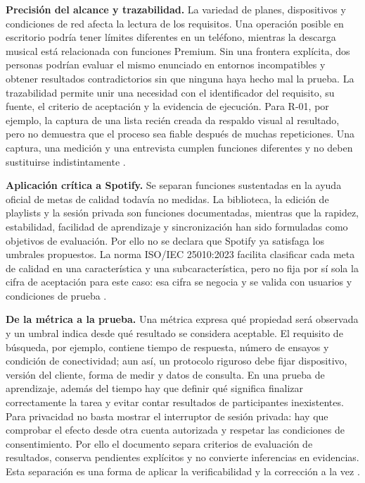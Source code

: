 \textbf{Precisión del alcance y trazabilidad.} La variedad de planes, dispositivos y condiciones de red afecta la lectura de los requisitos. Una operación posible en escritorio podría tener límites diferentes en un teléfono, mientras la descarga musical está relacionada con funciones Premium. Sin una frontera explícita, dos personas podrían evaluar el mismo enunciado en entornos incompatibles y obtener resultados contradictorios sin que ninguna haya hecho mal la prueba. La trazabilidad permite unir una necesidad con el identificador del requisito, su fuente, el criterio de aceptación y la evidencia de ejecución. Para R-01, por ejemplo, la captura de una lista recién creada da respaldo visual al resultado, pero no demuestra que el proceso sea fiable después de muchas repeticiones. Una captura, una medición y una entrevista cumplen funciones diferentes y no deben sustituirse indistintamente \cite{iso29148,spotify-playlists,spotify-premium}.

\textbf{Aplicación crítica a Spotify.} Se separan funciones sustentadas en la ayuda oficial de metas de calidad todavía no medidas. La biblioteca, la edición de playlists y la sesión privada son funciones documentadas, mientras que la rapidez, estabilidad, facilidad de aprendizaje y sincronización han sido formuladas como objetivos de evaluación. Por ello no se declara que Spotify ya satisfaga los umbrales propuestos. La norma ISO/IEC 25010:2023 facilita clasificar cada meta de calidad en una característica y una subcaracterística, pero no fija por sí sola la cifra de aceptación para este caso: esa cifra se negocia y se valida con usuarios y condiciones de prueba \cite{iso25010,pohl2025}.


\textbf{De la métrica a la prueba.} Una métrica expresa qué propiedad será observada y un umbral indica desde qué resultado se considera aceptable. El requisito de búsqueda, por ejemplo, contiene tiempo de respuesta, número de ensayos y condición de conectividad; aun así, un protocolo riguroso debe fijar dispositivo, versión del cliente, forma de medir y datos de consulta. En una prueba de aprendizaje, además del tiempo hay que definir qué significa finalizar correctamente la tarea y evitar contar resultados de participantes inexistentes. Para privacidad no basta mostrar el interruptor de sesión privada: hay que comprobar el efecto desde otra cuenta autorizada y respetar las condiciones de consentimiento. Por ello el documento separa criterios de evaluación de resultados, conserva pendientes explícitos y no convierte inferencias en evidencias. Esta separación es una forma de aplicar la verificabilidad y la corrección a la vez \cite{iso29148,iso25010}.

